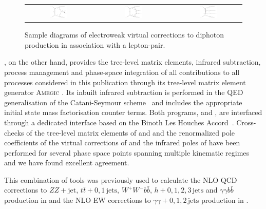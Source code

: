 \begin{figure}[t!]
  \begin{tabular}{ccccc}
    \includegraphics[width=0.288\textwidth]{diagrams/aaZ_V_2} & &
    \includegraphics[width=0.288\textwidth]{diagrams/aaZ_V_1} & &
    \includegraphics[width=0.288\textwidth]{diagrams/aaZ_V_3} \\
  \end{tabular}
  \caption{
    Sample diagrams of electroweak virtual corrections to diphoton 
    production in association with a lepton-pair.
    \label{fig:aaz:amps}
  }
\end{figure}

\Sherpa, on the other hand, provides the tree-level matrix 
elements, infrared subtraction, process management and phase-space 
integration of all contributions to all processes considered in 
this publication through its tree-level matrix element generator 
\textsc{Amegic} \cite{Krauss:2001iv}. 
Its inbuilt infrared subtraction is performed in the QED 
generalisation of the Catani-Seymour scheme~\cite{Catani:1996vz,
  Dittmaier:1999mb,Gleisberg:2007md,Kallweit:2014xda,
  Kallweit:2015dum,Kallweit:2017khh,Schoenherr:2017xxx}
and includes the appropriate initial state mass factorisation 
counter terms.
Both programs, \Sherpa and \GoSam, are interfaced through a 
dedicated interface based on the 
Binoth Les Houches Accord~\cite{Binoth:2010xt,Alioli:2013nda}. 
Cross-checks of the tree-level matrix elements of \GoSam and 
\Sherpa and the renormalized pole coefficients of the virtual 
corrections of \GoSam and the infrared poles of \Sherpa have 
been performed for several phase space points spanning 
multiple kinematic regimes and we have found excellent 
agreement.

This combination of tools was previously used to calculate the 
NLO QCD corrections to $ZZ+\text{jet}$, $t\bar{t}+0,1\,\text{jets}$, 
$W^{+}W^{-}b\bar{b}$, $h+0,1,2,3\,\text{jets}$  and $\gamma\gamma b \bar{b}$ production 
in \cite{Binoth:2009wk,Hoeche:2013mua,Heinrich:2013qaa,
  Greiner:2015jha,Greiner:2016awe,Heinrich:2017bqp,Faeh:2017fpp} and the 
NLO EW corrections to $\gamma\gamma+0,1,2\,\text{jets}$ production 
in \cite{Chiesa:2017gqx}.
